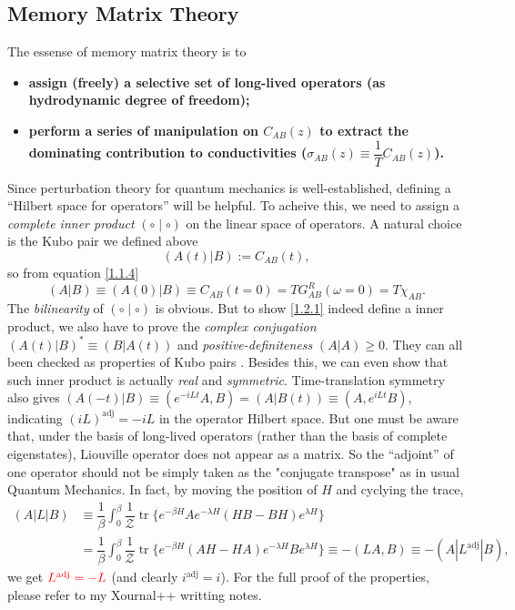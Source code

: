 \documentclass[10pt,nofootinbib,letterpaper]{revtex4}
\newcounter{Note}[section]
\newenvironment{Note}[1][]{{\par\normalfont\bfseries \underline{Note~\stepcounter{Note}\arabic{Note}.}~#1~~}}{\par}
\begin{document}
		\subsection{Memory Matrix Theory}
			The essense of memory matrix theory is to
			\begin{itemize}
				\item \textbf{assign (freely) a selective set of long-lived operators (as hydrodynamic degree of freedom);}
				\item \textbf{perform a series of manipulation on $C_{AB}(z)$ to extract the dominating contribution to conductivities ($\sigma_{AB}(z)\equiv\dfrac{1}{T}C_{AB}(z)$).}
			\end{itemize}
			Since perturbation theory for quantum mechanics is well-established, defining a ``Hilbert space for operators'' will be helpful. To acheive this, we need to assign a \emph{complete inner product} $(\circ\mid\circ)$ on the linear space of operators. A natural choice is the Kubo pair we defined above
			\begin{equation}\label{1.2.1}
				(A(t)|B):=C_{AB}(t),
			\end{equation}
			so from equation \eqref{1.1.4}
			\begin{equation}\label{1.2.2}
				(A|B)\equiv(A(0)|B)\equiv C_{AB}(t=0)=T G^R_{AB}(\omega=0)=T\chi_{AB}.
			\end{equation}
			\begin{Note}
				The \emph{bilinearity} of $(\circ\mid\circ)$ is obvious. But to show \eqref{1.2.1} indeed define a inner product, we also have to prove the \emph{complex conjugation} $(A(t)|B)^*\equiv(B|A(t))$ and \emph{positive-definiteness} $(A|A)\geq0$. They can all been checked as properties of Kubo pairs \cite{kubo1957statistical,forster2018hydrodynamic}. Besides this, we can even show that such inner product is actually \emph{real} and \emph{symmetric}. Time-translation symmetry also gives $(A(-t)|B)\equiv(e^{-iLt}A,B)=(A|B(t))\equiv(A,e^{iLt}B)$, indicating $(iL)^{\mathrm{adj}}=-iL$ in the operator Hilbert space. But one must be aware that, {\color{red}under the basis of long-lived operators (rather than the basis of complete eigenstates), Liouville operator does not appear as a matrix. So the ``adjoint'' of one operator should not be simply taken as the "conjugate transpose" as in usual Quantum Mechanics}. In fact, by moving the position of $H$ and cyclying the trace,
				\begin{align*}
					(A|L|B)&\equiv\dfrac{1}{\beta}\int_0^\beta\dfrac{1}{\mathcal{Z}}\mathop{\mathrm{tr}}\bigg\{e^{-\beta H}Ae^{-\lambda H}(HB-BH)e^{\lambda H}\bigg\}\\
					&=\dfrac{1}{\beta}\int_0^\beta\dfrac{1}{\mathcal{Z}}\mathop{\mathrm{tr}}\bigg\{e^{-\beta H}(AH-HA)e^{-\lambda H}Be^{\lambda H}\bigg\}\equiv-(LA,B)\equiv-(A|L^{\mathrm{adj}}|B),
				\end{align*}
				we get ${\color{red}L^{\mathrm{adj}}=-L}$ (and clearly $i^{\mathrm{adj}}=i$). For the full proof of the properties, please refer to my Xournal++ writting notes.
			\end{Note}
\end{document}
